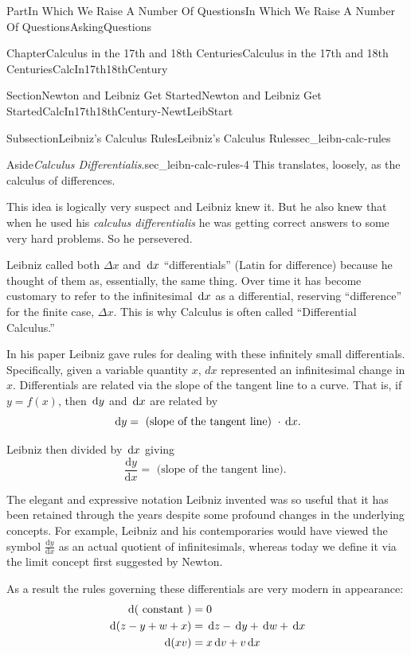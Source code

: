 \documentclass[oneside,10pt,]{book}
\numberwithin{equation}{part}
\newcommand{\dx}[1]{\,{\rm d}#1}
\newcommand{\dfdx}[2]{\frac{\text{d}{#1}}{\text{d}{#2}}}
\newcommand{\amp}{&}
\begin{document}
\begin{partptx}{Part}{In Which We Raise A Number Of Questions}{}{In Which We Raise A Number Of Questions}{}{}{AskingQuestions}
\begin{chapterptx}{Chapter}{Calculus in the 17th and 18th Centuries}{}{Calculus in the 17th and 18th Centuries}{}{}{CalcIn17th18thCentury}
\begin{sectionptx}{Section}{Newton and Leibniz Get Started}{}{Newton and Leibniz Get Started}{}{}{CalcIn17th18thCentury-NewtLeibStart}
\begin{subsectionptx}{Subsection}{Leibniz's Calculus Rules}{}{Leibniz's Calculus Rules}{}{}{sec_leibn-calc-rules}
\begin{aside}{Aside}{\textit{Calculus Differentialis}.}{sec_leibn-calc-rules-4}%
This translates, loosely, as the calculus of differences.%
\end{aside}
This idea is logically very suspect and Leibniz knew it.  But he also knew that when he used his \textit{calculus differentialis} he was getting correct answers to some very hard problems.  So he persevered.%
\par
Leibniz called both \(\Delta x\) and \(\dx{ x}\) ``differentials'' (Latin for difference) because he thought of them as, essentially, the same thing.  Over time it has become customary to refer to the infinitesimal \(\dx{ x}\) as a differential, reserving ``difference'' for the finite case, \(\Delta x\).  This is why Calculus is often called ``Differential Calculus.''%
\par
In his paper Leibniz gave rules for dealing with these infinitely small differentials.  Specifically, given a variable quantity \(x\), \(dx\) represented an infinitesimal change in \(x\).  Differentials are related via the slope of the tangent line to a curve.  That is, if \(y=f(x)\), then \(\dx{ y}\) and \(\dx{ x}\) are related by%
\begin{equation*}
\dx{ y}=\text{ (slope of the tangent line) } \cdot \dx{ x}\text{.}
\end{equation*}
%
\par
Leibniz then divided by \(\dx{ x}\) giving%
\begin{equation*}
\dfdx{y}{x}= \text{ (slope of the tangent line). }
\end{equation*}
%
\par
The elegant and expressive notation Leibniz invented was so useful that it has been retained through the years despite some profound changes in the underlying concepts.  For example, Leibniz and his contemporaries would have viewed the symbol \(\dfdx{y}{x}\) as an actual quotient of infinitesimals, whereas today we define it via the limit concept first suggested by Newton.  %
\par
As a result the rules governing these differentials are very modern in appearance: %
\begin{align*}
\dx{(\text{ constant } )}\amp =0\\
\dx{(z-y+w+x)}\amp =\dx{ z}-\dx{ y}+\dx{ w}+\dx{ x}\\
\dx{(xv)}\amp =x\dx{ v}+v\dx{ x}\\

\end{align*}
\end{subsectionptx}
\end{sectionptx}
\end{chapterptx}
\end{partptx}
\end{document}
